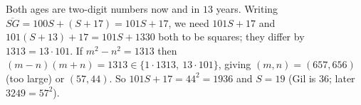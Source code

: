 Both ages are two-digit numbers now and in $13$ years. Writing $\overline{SG}=100S+(S+17)=101S+17$, we need $101S+17$ and $101(S+13)+17=101S+1330$ both to be squares; they differ by $1313=13\cdot101$. If $m^2-n^2=1313$ then $(m-n)(m+n)=1313\in\{1\cdot1313,\ 13\cdot101\}$, giving $(m,n)=(657,656)$ (too large) or $(57,44)$. So $101S+17=44^2=1936$ and $S=\boxed{19}$ (Gil is $36$; later $3249=57^2$).
